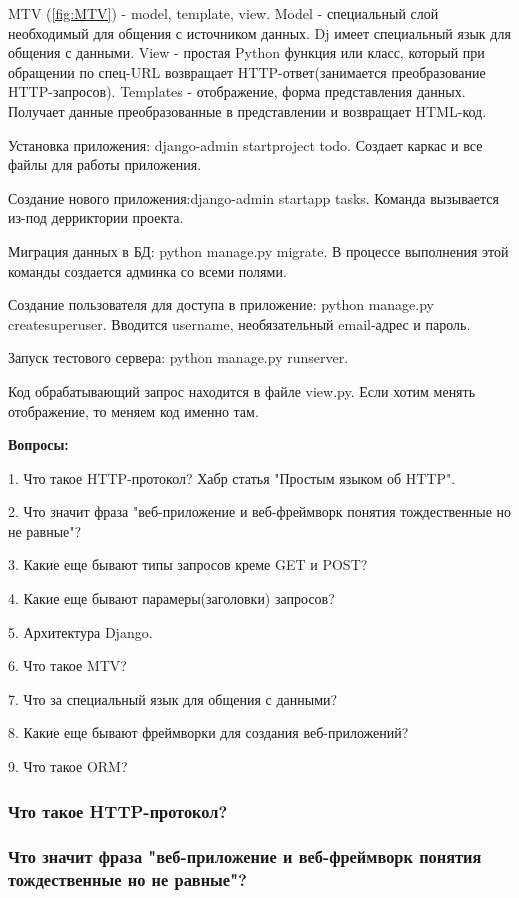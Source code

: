 \documentclass[%
	11pt,
	a4paper,
	utf8,
		]{article}
\begin{document}
MTV (\ref{fig:MTV}) - model, template, view. Model - специальный слой необходимый для общения с источником данных. Dj имеет специальный язык для общения с данными. View - простая Python функция или класс, который при обращении по спец-URL возвращает HTTP-ответ(занимается преобразование  HTTP-запросов). Templates - отображение, форма представления данных. Получает данные преобразованные в представлении и возвращает HTML-код.

Установка приложения: django-admin startproject todo. Создает каркас и все файлы для работы приложения.

Создание нового приложения:django-admin startapp tasks. Команда вызывается из-под дерриктории проекта.

Миграция данных в БД: python manage.py migrate. В процессе выполнения этой команды создается админка со всеми полями.

Создание пользователя для доступа в приложение: python manage.py createsuperuser. Вводится username, необязательный email-адрес и пароль.

Запуск тестового сервера: python manage.py runserver.

Код обрабатывающий запрос находится в файле  view.py. Если хотим менять отображение, то меняем код именно там.


\textbf{Вопросы:}

1. Что такое HTTP-протокол? Хабр статья "Простым языком об HTTP".

2. Что значит фраза "веб-приложение и веб-фреймворк понятия тождественные но не равные"?

3. Какие еще бывают типы запросов креме GET и POST?

4. Какие еще бывают парамеры(заголовки) запросов?

5. Архитектура Django.

6. Что такое MTV?

7. Что за специальный язык для общения с данными?

8. Какие еще бывают фреймворки для создания веб-приложений?

9. Что такое ORM?

\subsubsection{Что такое HTTP-протокол?}

\subsubsection{Что значит фраза "веб-приложение и веб-фреймворк понятия тождественные но не равные"?}
\end{document}
